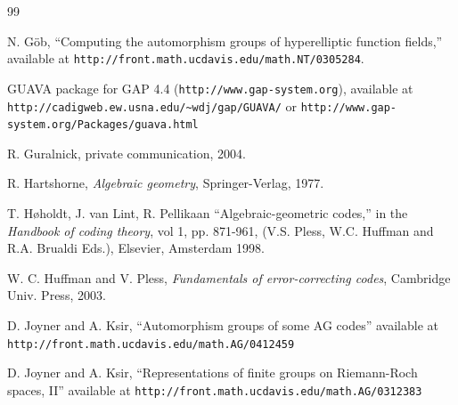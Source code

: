\documentclass[12pt]{article}
\numberwithin{equation}{section}
\begin{document}
\begin{thebibliography}{99}  

%
%
%
%
% 
%


 N. G\"ob, ``Computing the automorphism groups of
hyperelliptic function fields,'' available at
\verb+http://front.math.ucdavis.edu/math.NT/0305284+.

GUAVA package for GAP 4.4 (\verb+http://www.gap-system.org+),
available at
\verb+http://cadigweb.ew.usna.edu/~wdj/gap/GUAVA/+
or
\newline
\verb+http://www.gap-system.org/Packages/guava.html+

 R. Guralnick, private communication, 2004.

 R. Hartshorne, {\it Algebraic geometry},
Springer-Verlag, 1977.

T. H\o holdt, J. van Lint, R. Pellikaan
``Algebraic-geometric codes,''
in the {\it Handbook of coding theory}, vol 1, pp. 871-961,
(V.S. Pless, W.C. Huffman and R.A. Brualdi Eds.),
Elsevier, Amsterdam 1998.

 W. C. Huffman and V. Pless, 
{\it Fundamentals of 
error-correcting codes}, Cambridge Univ. Press, 2003.

 D. Joyner and A. Ksir, 
``Automorphism groups of some AG codes'' available at
\verb+http://front.math.ucdavis.edu/math.AG/0412459+

 D. Joyner and A. Ksir, 
``Representations of finite groups on Riemann-Roch
spaces, II'' available at
\verb+http://front.math.ucdavis.edu/math.AG/0312383+


\end{thebibliography}
\end{document}
